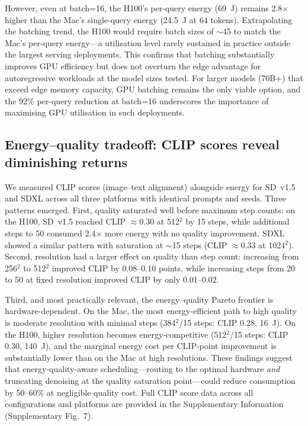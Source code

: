 \documentclass[11pt]{article}
\begin{document}
However, even at batch=16, the H100's per-query energy (69~J) remains 2.8$\times$ higher than the Mac's single-query energy (24.5~J at 64 tokens). Extrapolating the batching trend, the H100 would require batch sizes of $\sim$45 to match the Mac's per-query energy---a utilisation level rarely sustained in practice outside the largest serving deployments. This confirms that batching substantially improves GPU efficiency but does not overturn the edge advantage for autoregressive workloads at the model sizes tested. For larger models (70B+) that exceed edge memory capacity, GPU batching remains the only viable option, and the 92\% per-query reduction at batch=16 underscores the importance of maximising GPU utilisation in such deployments.

\subsection{Energy--quality tradeoff: CLIP scores reveal diminishing returns}

We measured CLIP scores (image--text alignment) alongside energy for SD~v1.5 and SDXL across all three platforms with identical prompts and seeds. Three patterns emerged. First, quality saturated well before maximum step counts: on the H100, SD~v1.5 reached CLIP $\approx$0.30 at 512$^2$ by 15 steps, while additional steps to 50 consumed 2.4$\times$ more energy with no quality improvement. SDXL showed a similar pattern with saturation at $\sim$15 steps (CLIP $\approx$0.33 at 1024$^2$). Second, resolution had a larger effect on quality than step count: increasing from 256$^2$ to 512$^2$ improved CLIP by 0.08--0.10 points, while increasing steps from 20 to 50 at fixed resolution improved CLIP by only 0.01--0.02.

Third, and most practically relevant, the energy--quality Pareto frontier is hardware-dependent. On the Mac, the most energy-efficient path to high quality is moderate resolution with minimal steps (384$^2$/15 steps: CLIP 0.28, 16~J). On the H100, higher resolution becomes energy-competitive (512$^2$/15 steps: CLIP 0.30, 140~J), and the marginal energy cost per CLIP-point improvement is substantially lower than on the Mac at high resolutions. These findings suggest that energy-quality-aware scheduling---routing to the optimal hardware \textit{and} truncating denoising at the quality saturation point---could reduce consumption by 50--60\% at negligible quality cost. Full CLIP score data across all configurations and platforms are provided in the Supplementary Information (Supplementary Fig.~7).
\end{document}
